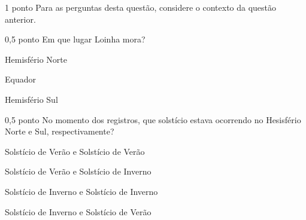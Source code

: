 \documentclass{../lista}
\begin{document}
	\begin{questao}{1 ponto}
		Para as perguntas desta questão, considere o contexto da questão anterior.

		\begin{pergunta}{0,5 ponto}
			Em que lugar Loinha mora?
			\begin{alternativas}
				\item Hemisfério Norte
				\item Equador
				\item Hemisfério Sul
			\end{alternativas}
		\end{pergunta}

		\begin{pergunta}{0,5 ponto}
			No momento dos registros, que solstício estava ocorrendo no Hesisfério Norte e Sul, respectivamente?
			\begin{alternativas}
				\item Solstício de Verão e Solstício de Verão
				\item Solstício de Verão e Solstício de Inverno
				\item Solstício de Inverno e Solstício de Inverno
				\item Solstício de Inverno e Solstício de Verão
			\end{alternativas}
		\end{pergunta}
	\end{questao}

	\encerramento
\end{document}
